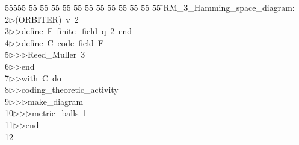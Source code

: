 %
%
\begin{tabbing}
55555 \= 55 \= 55 \= 55 \= 55 \= 55 \= 55 \= 55 \= 55 \= 55 \= 55 \= 55 \= 55 \= \>RM\_3\_Hamming\_space\_diagram:\\[0pt]
2\>$\triangleright$\>(ORBITER)\ v\ 2\ \\[0pt]
3\>$\triangleright$\>$\triangleright$\>define\ F\ finite\_field\ q\ 2\ end\ \\[0pt]
4\>$\triangleright$\>$\triangleright$\>define\ C\ code\ field\ F\ \\[0pt]
5\>$\triangleright$\>$\triangleright$\>$\triangleright$\>Reed\_Muller\ 3\ \\[0pt]
6\>$\triangleright$\>$\triangleright$\>end\ \\[0pt]
7\>$\triangleright$\>$\triangleright$\>with\ C\ do\ \\[0pt]
8\>$\triangleright$\>$\triangleright$\>coding\_theoretic\_activity\ \\[0pt]
9\>$\triangleright$\>$\triangleright$\>$\triangleright$\>make\_diagram\ \\[0pt]
10\>$\triangleright$\>$\triangleright$\>$\triangleright$\>metric\_balls\ 1\ \\[0pt]
11\>$\triangleright$\>$\triangleright$\>end\\[0pt]
12\>\end{tabbing}

